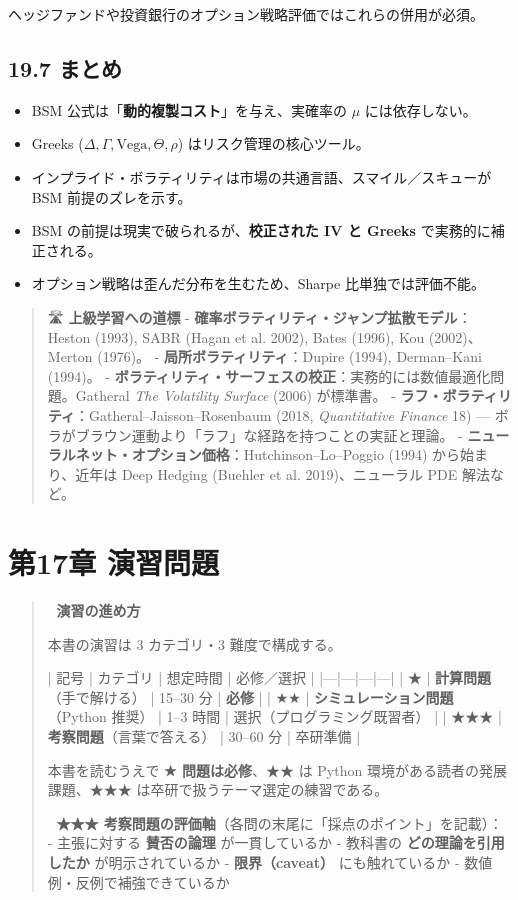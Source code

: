\documentclass[11pt,a4paper]{report}
\begin{document}
ヘッジファンドや投資銀行のオプション戦略評価ではこれらの併用が必須。

\section{19.7 まとめ}

\begin{itemize}
\item BSM 公式は「\textbf{動的複製コスト}」を与え、実確率の $\mu$ には依存しない。
\item Greeks ($\Delta, \Gamma, \mathrm{Vega}, \Theta, \rho$) はリスク管理の核心ツール。
\item インプライド・ボラティリティは市場の共通言語、スマイル／スキューが BSM 前提のズレを示す。
\item BSM の前提は現実で破られるが、\textbf{校正された IV と Greeks} で実務的に補正される。
\item オプション戦略は歪んだ分布を生むため、Sharpe 比単独では評価不能。
\end{itemize}

\begin{quote}
🛣 \textbf{上級学習への道標}
- \textbf{確率ボラティリティ・ジャンプ拡散モデル}：Heston (1993), SABR (Hagan et al. 2002), Bates (1996), Kou (2002)、Merton (1976)。
- \textbf{局所ボラティリティ}：Dupire (1994), Derman–Kani (1994)。
- \textbf{ボラティリティ・サーフェスの校正}：実務的には数値最適化問題。Gatheral \emph{The Volatility Surface} (2006) が標準書。
- \textbf{ラフ・ボラティリティ}：Gatheral–Jaisson–Rosenbaum (2018, \emph{Quantitative Finance} 18) — ボラがブラウン運動より「ラフ」な経路を持つことの実証と理論。
- \textbf{ニューラルネット・オプション価格}：Hutchinson–Lo–Poggio (1994) から始まり、近年は Deep Hedging (Buehler et al. 2019)、ニューラル PDE 解法など。
\end{quote}

\noindent\hrulefill

\chapter{第17章 演習問題}

\begin{quote}
🎯 \textbf{演習の進め方}

本書の演習は 3 カテゴリ・3 難度で構成する。

| 記号 | カテゴリ | 想定時間 | 必修／選択 |
|---|---|---|---|
| ★ | \textbf{計算問題}（手で解ける） | 15–30 分 | \textbf{必修} |
| ★★ | \textbf{シミュレーション問題}（Python 推奨） | 1–3 時間 | 選択（プログラミング既習者） |
| ★★★ | \textbf{考察問題}（言葉で答える） | 30–60 分 | 卒研準備 |

本書を読むうえで \textbf{★ 問題は必修}、★★ は Python 環境がある読者の発展課題、★★★ は卒研で扱うテーマ選定の練習である。

📝 \textbf{★★★ 考察問題の評価軸}（各問の末尾に「採点のポイント」を記載）：
- 主張に対する \textbf{賛否の論理} が一貫しているか
- 教科書の \textbf{どの理論を引用したか} が明示されているか
- \textbf{限界（caveat）} にも触れているか
- 数値例・反例で補強できているか
\end{quote}
\end{document}

